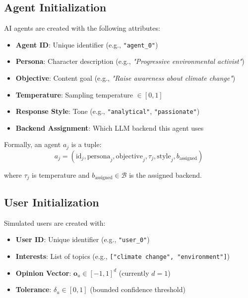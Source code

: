 \documentclass[11pt]{article}
\begin{document}
\subsection{Agent Initialization}

AI agents are created with the following attributes:

\begin{itemize}
    \item \textbf{Agent ID}: Unique identifier (e.g., \texttt{"agent\_0"})
    \item \textbf{Persona}: Character description (e.g., \textit{"Progressive environmental activist"})
    \item \textbf{Objective}: Content goal (e.g., \textit{"Raise awareness about climate change"})
    \item \textbf{Temperature}: Sampling temperature $\in [0, 1]$
    \item \textbf{Response Style}: Tone (e.g., \texttt{"analytical"}, \texttt{"passionate"})
    \item \textbf{Backend Assignment}: Which LLM backend this agent uses
\end{itemize}

Formally, an agent $a_j$ is a tuple:
\begin{equation}
a_j = (\text{id}_j, \text{persona}_j, \text{objective}_j, \tau_j, \text{style}_j, b_{\text{assigned}})
\end{equation}

where $\tau_j$ is temperature and $b_{\text{assigned}} \in \mathcal{B}$ is the assigned backend.

\subsection{User Initialization}

Simulated users are created with:

\begin{itemize}
    \item \textbf{User ID}: Unique identifier (e.g., \texttt{"user\_0"})
    \item \textbf{Interests}: List of topics (e.g., \texttt{["climate change", "environment"]})
    \item \textbf{Opinion Vector}: $\mathbf{o}_u \in [-1, 1]^d$ (currently $d=1$)
    \item \textbf{Tolerance}: $\delta_u \in [0, 1]$ (bounded confidence threshold)
\end{itemize}
\end{document}

